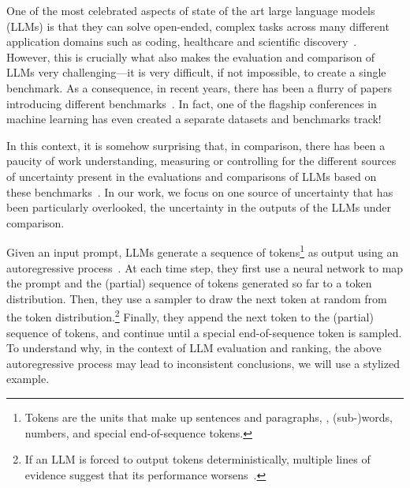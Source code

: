 %
One of the most celebrated aspects of state of the art large language models (LLMs) is that they can solve open-ended, complex tasks across many different application domains such as coding, healthcare and scientific discovery~\cite{bubeck2023sparks, mozannar2022reading, haupt2023ai, romera2023mathematical}. 
%
However, this is crucially what also makes the evaluation and comparison of LLMs very challenging---it is very difficult, if not impossible, to create a single benchmark.
%
As a consequence, in recent years, there has been a flurry of papers introducing different benchmarks~\cite{bach2022promptsource,wei2022finetuned,talmor2019commonsense,mishra2022cross,chen2021evaluating,liang2023holistic,longpre2023flan,hendryckstest2021,wang2022self,ouyang2022training,wang2023aligning,chiang2024chatbot,taori2023stanford,zheng2023judging,li2023generative,li2023prd,boubdir2023elo,singhal2023large}.
%
In fact, one of the flagship conferences in machine learning has even created a separate datasets and benchmarks track!

%
In this context, it is somehow surprising that, in comparison, there has been a paucity of work understanding, measuring or controlling for the different sources of uncertainty present in the evaluations and comparisons of LLMs based on these benchmarks~\cite{miller2024adding,madaan2024quantifying,dubey2024llama,saadfalcon2023ares,boyeau2024autoeval,chatzi2024prediction,dorner2024limits,gera2024justrank}.
%
In our work, we focus on one source of uncertainty that has been particularly overlooked, the uncertainty in the outputs of the LLMs under comparison.

%
Given an input prompt, LLMs generate a sequence of tokens\footnote{Tokens are the units that make up sentences and paragraphs, \eg, (sub-)words, numbers, and special end-of-sequence tokens.} as output using an autoregressive process~\cite{bengio2000neural,radford2019language}. 
%
At each time step, they first use a neural network to map the prompt and the (partial) sequence of tokens generated so far to a token distribution. 
%
Then, they use a sampler to draw the next token at random from the token distribution.\footnote{If an LLM is forced to output tokens deterministically, multiple lines of evidence suggest that its performance worsens~\citep{holtzman2020the}.}
%
Finally, they append the next token to the (partial) sequence of tokens, and continue until a special end-of-sequence token is sampled.
%
To understand why, in the context of LLM evaluation and ranking, the above autoregressive process may lead to inconsistent conclusions, we will use a stylized example.

